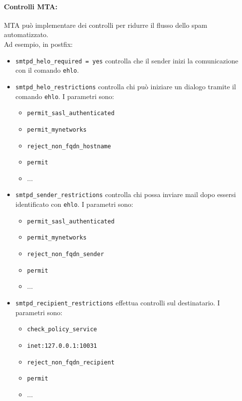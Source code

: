 \documentclass[a4paper]{report}
\begin{document}
\paragraph{Controlli MTA:} MTA può implementare dei controlli per ridurre il flusso dello spam automatizzato.\\
Ad esempio, in postfix:
\begin{itemize}
\item \texttt{smtpd\_helo\_required = yes} controlla che il sender inizi la comunicazione con il comando \texttt{ehlo}.
\item \texttt{smtpd\_helo\_restrictions} controlla chi può iniziare un dialogo tramite il comando \texttt{ehlo}. I parametri sono:
	\begin{itemize}
	\item \texttt{permit\_sasl\_authenticated}
	\item \texttt{permit\_mynetworks}
	\item \texttt{reject\_non\_fqdn\_hostname}
	\item \texttt{permit}
	\item ...
	\end{itemize}
\item \texttt{smtpd\_sender\_restrictions} controlla chi possa inviare mail dopo essersi identificato con \texttt{ehlo}. I parametri sono:
	\begin{itemize}
	\item \texttt{permit\_sasl\_authenticated}
	\item \texttt{permit\_mynetworks}
	\item \texttt{reject\_non\_fqdn\_sender}
	\item \texttt{permit}
	\item ...
	\end{itemize} 
\item \texttt{smtpd\_recipient\_restrictions} effettua controlli sul destinatario. I parametri sono:
	\begin{itemize}
	\item \texttt{check\_policy\_service}
	\item \texttt{inet:127.0.0.1:10031}
	\item \texttt{reject\_non\_fqdn\_recipient}
	\item \texttt{permit}
	\item ...
	\end{itemize} 
\end{itemize}
\end{document}
